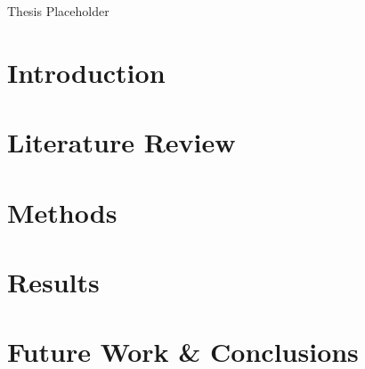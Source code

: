 \documentclass[11pt]{article}
\begin{document}
\begin{center}
Thesis Placeholder
\end{center}

\section{Introduction}

\section{Literature Review}

\section{Methods} 

\section{Results}

\section{Future Work \& Conclusions}
\end{document}
